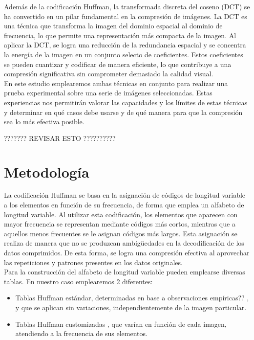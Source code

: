 \documentclass[12pt,a4paper]{article}
\begin{document}
Además de la codificación Huffman, la transformada discreta del coseno (DCT) se ha convertido en un pilar fundamental en la compresión de imágenes. La DCT es una técnica que transforma la imagen del dominio espacial al dominio de frecuencia, lo que permite una representación más compacta de la imagen. Al aplicar la DCT, se logra una reducción de la redundancia espacial y se concentra la energía de la imagen en un conjunto selecto de coeficientes. Estos coeficientes se pueden cuantizar y codificar de manera eficiente, lo que contribuye a una compresión significativa sin comprometer demasiado la calidad visual.\\

En este estudio emplearemos ambas técnicas en conjunto para realizar una prueba experimental sobre una serie de imágenes seleccionadas. Estas experiencias nos permitirán valorar las capacidades y los límites de estas técnicas y determinar en qué casos debe usarse y de qué manera para que la compresión sea lo más efectiva posible.

??????? REVISAR ESTO ??????????



\newpage
\section{Metodología}
La codificación Huffman se basa en la asignación de códigos de longitud variable a los elementos en función de su frecuencia, de forma que emplea un alfabeto de longitud variable. Al utilizar esta codificación, los elementos que aparecen con mayor frecuencia se representan mediante códigos más cortos, mientras que a aquellos menos frecuentes se le asignan códigos más largos. Esta asignación se realiza de manera que no se produzcan ambigüedades en la decodificación de los datos comprimidos. De esta forma, se logra una compresión efectiva al aprovechar las repeticiones y patrones presentes en los datos originales.\\

Para la construcción del alfabeto de longitud variable pueden emplearse diversas tablas. En nuestro caso emplearemos 2 diferentes:
\begin{itemize}
    \item Tablas Huffman estándar, determinadas en base a observaciones empíricas?? , y que se aplican sin variaciones, independientemente de la imagen particular.
    \item Tablas Huffman customizadas , que varían en función de cada imagen, atendiendo a la frecuencia de sus elementos.
\end{itemize}
\end{document}
